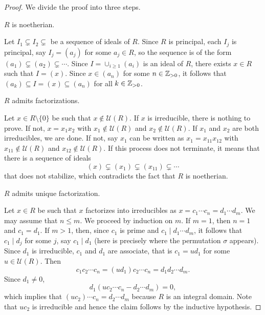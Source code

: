 \begin{proof}
	We divide the proof into three steps. 
	\begin{claim}
		$R$ is noetherian. 	
	\end{claim}
	
	Let $I_1\subsetneq I_2\subsetneq$ be a sequence of ideals of $R$.  
	Since $R$ is principal, each $I_j$ is principal, 
	say $I_j=(a_j)$ for some $a_j\in R$, so the sequence is of the form
	$(a_1)\subsetneq (a_2)\subsetneq\cdots$. Since $I=\cup_{i\geq1}(a_i)$ is an ideal of $R$, 
	there exists $x\in R$ such that $I=(x)$. Since $x\in (a_n)$ for some $n\in\mathbb{Z}_{>0}$, 
	it follows that $(a_k)\subseteq I=(x)\subseteq (a_n)$ for all $k\in\mathbb{Z}_{>0}$. 
	
	\begin{claim}
		$R$ admits factorizations. 	
	\end{claim}
	
	Let $x\in R\setminus\{0\}$ be such that $x\not\in\mathcal{U}(R)$. If $x$ is irreducible, 
	there is nothing to prove. If not, $x=x_1x_2$ with $x_1\not\in\mathcal{U}(R)$ and
	$x_2\not\in\mathcal{U}(R)$. If $x_1$ and $x_2$ are both irreducibles, 
	we are done. If not, say $x_1$ can be written as $x_1=x_{11}x_{12}$ with
	$x_{11}\not\in\mathcal{U}(R)$ and $x_{12}\not\in\mathcal{U}(R)$. If this process
	does not terminate, it means that there is a sequence of ideals
	\[
	(x)\subsetneq (x_1)\subsetneq (x_{11})\subsetneq\cdots 
	\]
	that does not stabilize, which contradicts the fact that $R$ is noetherian.  
	
	\begin{claim}
		$R$ admits unique factorization.	
	\end{claim}
	
	Let $x\in R$ be such that $x$ factorizes into irreducibles as 
	$x=c_1\cdots c_n=d_1\cdots d_m$. We may assume that $n\leq m$. We proceed by 
	induction on $m$. If $m=1$, then 
	$n=1$ and $c_1=d_1$. If $m>1$, then, since $c_1$ is prime and 
	$c_1\mid d_1\cdots d_m$, it follows that $c_1\mid d_j$ for some $j$, say $c_1\mid d_1$ (here is precisely where the permutation $\sigma$ appears). Since
	$d_1$ is irreducible, $c_1$ and $d_1$ are associate, that is
	$c_1=ud_1$ for some $u\in\mathcal{U}(R)$. Then
	\[
	c_1c_2\cdots c_n=(ud_1)c_2\cdots c_n=d_1d_2\cdots d_m. 
	\]
	Since $d_1\ne 0$,  
	\[
	d_1(uc_2\cdots c_n-d_2\cdots d_m)=0,
	\]
	which implies that $(uc_2)\cdots c_n=d_2\cdots d_m$ because $R$ is an integral domain. Note
	that $uc_2$ is irreducible and hence 
	the claim follows by the inductive hypothesis. 
\end{proof}

